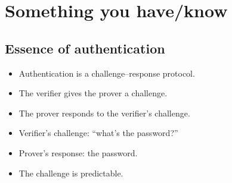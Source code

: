 \mode*




\section{Something you have/know}

\subsection{Essence of authentication}

\begin{frame}
  \begin{remark}
    \begin{itemize}
      \item Authentication is a challenge--response protocol.
      \item The verifier gives the prover a challenge.
      \item The prover responds to the verifier's challenge.
    \end{itemize}
  \end{remark}

  \pause

  \begin{example}[Passwords]
    \begin{itemize}
      \item Verifier's challenge: \enquote{what's the password?}
      \item Prover's response: the password.
    \end{itemize}
  \end{example}

  \pause

  \begin{remark}[Predictability]
    \begin{itemize}
      \item The challenge is predictable.
    \end{itemize}
  \end{remark}
\end{frame}

